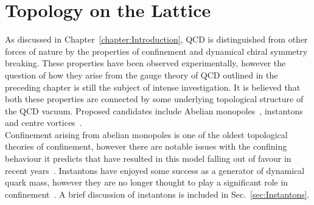 \chapter{Topology on the Lattice}\label{chapter:Topology}

\ifpdf
    \graphicspath{{Chapter3/Figs/Raster/}{Chapter3/Figs/PDF/}{Chapter3/Figs/}}
\else
    \graphicspath{{Chapter3/Figs/Vector/}{Chapter3/Figs/}}
\fi
As discussed in Chapter~\ref{chapter:Introduction}, QCD is distinguished from other forces of nature by the properties of confinement and dynamical chiral symmetry breaking. These properties have been observed experimentally, however the question of how they arise from the gauge theory of QCD outlined in the preceding chapter is still the subject of intense investigation. It is believed that both these properties are connected by some underlying topological structure of the QCD vacuum. Proposed candidates include Abelian monopoles~\cite{tHooft:1981bkw,Smit:1989vg,Matsubara:1993nq,Suzuki:1989gp,Mandelstam:1974pi,Kronfeld:1987ri,Ivanenko:1990xu, Chernodub:1995tt}, instantons~\cite{Belavin:1975fg,Witten:1978bc,Callan:1977gz,Schafer:1996wv,Trewartha:2013qga,Aharonov:1978jd} and centre vortices~\cite{'tHooft:1977hy,'tHooft:1979uj,Feynman:1981ss,Aharonov:1978jd,Cornwall:1979hz,Nielsen:1979xu,Mack:1978rq}.\\

Confinement arising from abelian monopoles is one of the oldest topological theories of confinement, however there are notable issues with the confining behaviour it predicts that have resulted in this model falling out of favour in recent years~\cite{Greensite:2003bk}. Instantons have enjoyed some success as a generator of dynamical quark mass, however they are no longer thought to play a significant role in confinement~\cite{Chen:1998ct}. A brief discussion of instantons is included in Sec.~\ref{sec:Instantons}.\\

